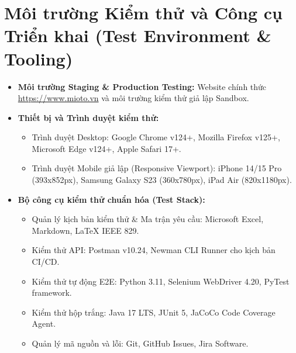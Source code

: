 \documentclass[12pt,a4paper,oneside]{report}
\begin{document}
\section{Môi trường Kiểm thử và Công cụ Triển khai (Test Environment \& Tooling)}
\begin{itemize}
  \item \textbf{Môi trường Staging \& Production Testing:} Website chính thức \url{https://www.mioto.vn} và môi trường kiểm thử giả lập Sandbox.
  \item \textbf{Thiết bị và Trình duyệt kiểm thử:}
    \begin{itemize}
      \item Trình duyệt Desktop: Google Chrome v124+, Mozilla Firefox v125+, Microsoft Edge v124+, Apple Safari 17+.
      \item Trình duyệt Mobile giả lập (Responsive Viewport): iPhone 14/15 Pro (393x852px), Samsung Galaxy S23 (360x780px), iPad Air (820x1180px).
    \end{itemize}
  \item \textbf{Bộ công cụ kiểm thử chuẩn hóa (Test Stack):}
    \begin{itemize}
      \item Quản lý kịch bản kiểm thử \& Ma trận yêu cầu: Microsoft Excel, Markdown, LaTeX IEEE 829.
      \item Kiểm thử API: Postman v10.24, Newman CLI Runner cho kịch bản CI/CD.
      \item Kiểm thử tự động E2E: Python 3.11, Selenium WebDriver 4.20, PyTest framework.
      \item Kiểm thử hộp trắng: Java 17 LTS, JUnit 5, JaCoCo Code Coverage Agent.
      \item Quản lý mã nguồn và lỗi: Git, GitHub Issues, Jira Software.
    \end{itemize}
\end{itemize}
\end{document}
